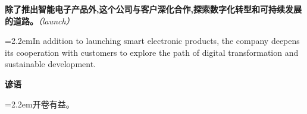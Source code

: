 \documentclass[11pt,a4paper]{article}
\newcommand{\num}[1]{\makebox[1.9em][r]{#1.}\hspace{0.3em}}
\newcommand{\prompt}[1]{\emph{\textcolor{tipblue}{\small（#1）}}}
\begin{document}
\num{4}\textbf{除了推出智能电子产品外,这个公司与客户深化合作,探索数字化转型和可持续发展的道路。}\prompt{launch}

\vspace{0.15em}

\noindent\hangindent=2.2em\hspace{2.2em}In addition to launching smart electronic products, the company deepens its cooperation with customers to explore the path of digital transformation and sustainable development.

\vspace{0.4em}\noindent{\color{rulegray}\rule{\textwidth}{0.6pt}}\vspace{0.4em}

\num{5}\textbf{谚语}\quad 

\vspace{0.15em}

\noindent\hangindent=2.2em\hspace{2.2em}开卷有益。
\end{document}
